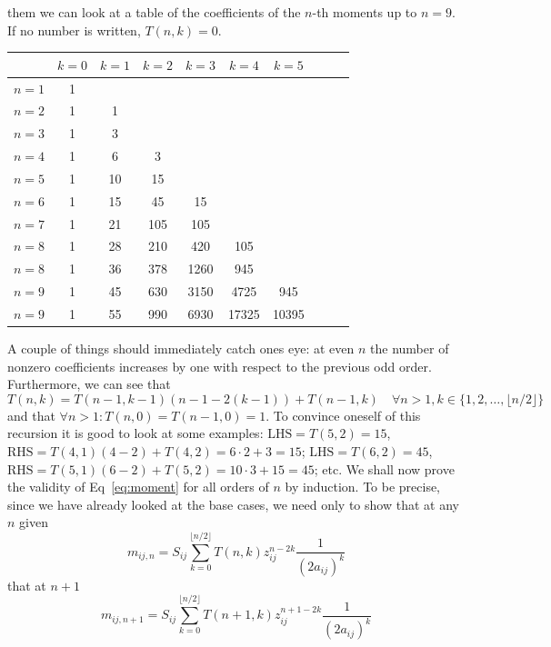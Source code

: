 \documentclass[a4paper, 11pt]{scrartcl}
\begin{document}
them we can look at a table of the coefficients of the $n$-th moments up to $n=9$. If no number is 
written, $T(n,k) = 0$.
\begin{table}[H]
    \centering
    \begin{tabular}{c | c c c c c c c c c}
     & $k=0$ & $k=1$ & $k=2$ & $k=3$ & $k=4$ & $k=5$\\ 
     \hline
    $n=1$ & 1 &  \\
    $n=2$ & 1 & 1 \\
    $n=3$ & 1 & 3 \\
    $n=4$ & 1 & 6 & 3 \\
    $n=5$ & 1 & 10 & 15 \\
    $n=6$ & 1 & 15 & 45 & 15 \\
    $n=7$ & 1 & 21 & 105 & 105 \\
    $n=8$ & 1 & 28 & 210 & 420 & 105 \\
    $n=8$ & 1 & 36 & 378 & 1260 & 945 \\
    $n=9$ & 1 & 45 & 630 & 3150 & 4725 & 945 \\
    $n=9$ & 1 & 55 & 990 & 6930 & 17325 & 10395 \\
    \end{tabular}
\end{table}
A couple of things should immediately catch ones eye: at even $n$ the number
of nonzero coefficients increases by one with respect to the previous odd order.
Furthermore, we can see that 
\begin{equation}
    T(n,k) = T(n-1, k-1) (n-1 - 2(k-1)) + T(n-1,k) \quad \forall n>1, k \in \{1,2,\ldots, \lfloor n/2 \rfloor\}
\end{equation}
and that $\forall n > 1: T(n,0) = T(n-1,0) = 1 $.
To convince oneself of this recursion it is good to look at some examples: 
$\mathrm{LHS} = T(5, 2) = 15$, $\mathrm{RHS} = T(4,1) (4 - 2) + T(4,2) = 6 \cdot 2 + 3 = 15$; 
$\mathrm{LHS} = T(6, 2) = 45$, $\mathrm{RHS} = T(5,1) (6 - 2) + T(5,2) = 10 \cdot 3 + 15 = 45$;
etc. We shall now prove the validity of Eq~\eqref{eq:moment} for all orders of $n$ by induction.
To be precise, since we have already looked at the base cases, we need only to show that at 
any $n$ given
\begin{equation}
    m_{ij, n} = S_{ij} \sum_{k=0}^{\lfloor n/2 \rfloor} T(n, k) z_{ij}^{n-2k} \frac{1}{(2 a_{ij})^k}
\end{equation}
that at $n+1$
\begin{equation}
    m_{ij, n+1} = S_{ij} \sum_{k=0}^{\lfloor n/2 \rfloor} T(n+1, k) z_{ij}^{n+1-2k} 
    \frac{1}{(2 a_{ij})^k}
\end{equation}
\end{document}
